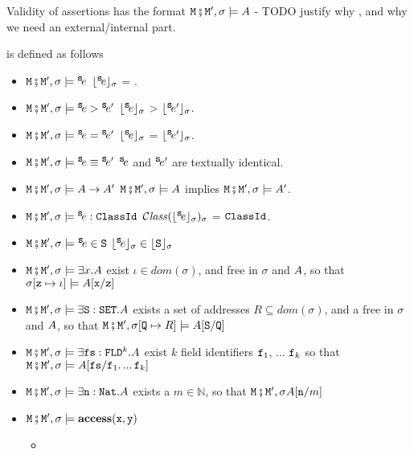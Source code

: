 Validity of assertions has the format $\M\mkpair \M', \sigma \models \A$ - TODO justify why \M, and why we need an external/internal part.

\begin{definition} is defined  as follows

\begin{itemize}
\item
$\M\mkpair \M', \sigma \models\SE$ \IFF  $\interp{\SE}{\sigma}$ = .
\item
$\M\mkpair \M', \sigma \models\SE>\SEPrime$ \IFF $\interp{\SE}{\sigma}$ > $\interp{\SEPrime}{\sigma}$.
\item
$\M\mkpair \M', \sigma \models\SE=\SEPrime$ \IFF $\interp{\SE}{\sigma}$ = $\interp{\SEPrime}{\sigma}$.
\item
$\M\mkpair \M', \sigma \models\SE\equiv\SEPrime$ \IFF $\SE$ and $\SEPrime$ are textually identical.
\item
$\M\mkpair \M', \sigma \models\A \rightarrow \A' $ \IFF $\M\mkpair \M', \sigma \models\A$ implies $\M\mkpair \M', \sigma \models\A'$. 
\item
$\M\mkpair \M', \sigma \models \SE:\prg{ClassId}$ \IFF $\ClassOf {\interp{\SE}{\sigma}} {\sigma}$ = $\prg{ClassId}$.
\item
$\M\mkpair \M', \sigma \models \SE\in \prg{S}$ \IFF $\interp{\SE}{\sigma}\in \interp{\prg{S}}{\sigma}$
\item
$\M\mkpair \M', \sigma \models \exists x.\A$ \IFF  exist  $\iota\in dom(\sigma)$, and    free in $\sigma$ and $\A$, so that
$\sigma[\prg{z}\mapsto \iota] \models  \A[\prg{x}/\prg{z}]$ 
\item
$\M\mkpair \M', \sigma \models \exists \prg{S}:\prg{SET}.\A$ \IFF  exists a set of addresses $R\subseteq dom(\sigma)$, and a  free in $\sigma$ and $\A$, so that
$\M\mkpair \M', \sigma[\prg{Q}\mapsto R] \models  \A[\prg{S}/\prg{Q}]$ 
\item
$\M\mkpair \M', \sigma \models  \exists \prg{fs}:\prg{FLD}^k.\A$ \IFF  exist $k$ field identifiers $\prg{f}_1$, ... $\prg{f}_k$ so that 
$\M\mkpair \M', \sigma \models  \A[\prg{fs}/\prg{f}_1.\,...\,\prg{f}_k]$ 
\item
$\M\mkpair \M', \sigma \models  \exists \prg{n}:\prg{Nat}.\A$ \IFF  exists a $m\in\mathbb{N}$, so that $\M\mkpair \M', \sigma \A[\prg{n}/m]$ 
\item
$\M\mkpair \M', \sigma \models  \CanAccess{\prg{x}}{\prg{y}}$   \IFF  \begin{itemize}
\item

\end{itemize}
\end{itemize}
\end{definition}
